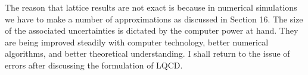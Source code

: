 The reason that lattice results are not exact is because in numerical
simulations we have to make a number of approximations as discussed in
Section 16. The size of the associated uncertainties is dictated by the
computer power at hand. They are being improved steadily with computer
technology, better numerical algorithms, and better theoretical understanding. I shall return to the issue of errors after discussing the formulation of
LQCD.
